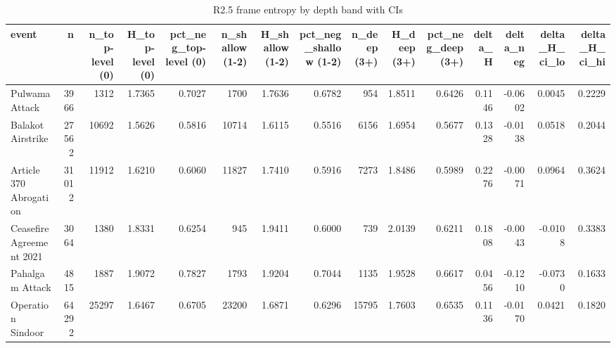 \begin{table}
\caption{R2.5 frame entropy by depth band with CIs}
\label{tab:r1r2_depth_diversification}
\begin{tabular}{lrrrrrrrrrrrrrr}
\toprule
event & n & n\_top-level (0) & H\_top-level (0) & pct\_neg\_top-level (0) & n\_shallow (1-2) & H\_shallow (1-2) & pct\_neg\_shallow (1-2) & n\_deep (3+) & H\_deep (3+) & pct\_neg\_deep (3+) & delta\_H & delta\_neg & delta\_H\_ci\_lo & delta\_H\_ci\_hi \\
\midrule
Pulwama Attack & 3966 & 1312 & 1.7365 & 0.7027 & 1700 & 1.7636 & 0.6782 & 954 & 1.8511 & 0.6426 & 0.1146 & -0.0602 & 0.0045 & 0.2229 \\
Balakot Airstrike & 27562 & 10692 & 1.5626 & 0.5816 & 10714 & 1.6115 & 0.5516 & 6156 & 1.6954 & 0.5677 & 0.1328 & -0.0138 & 0.0518 & 0.2044 \\
Article 370 Abrogation & 31012 & 11912 & 1.6210 & 0.6060 & 11827 & 1.7410 & 0.5916 & 7273 & 1.8486 & 0.5989 & 0.2276 & -0.0071 & 0.0964 & 0.3624 \\
Ceasefire Agreement 2021 & 3064 & 1380 & 1.8331 & 0.6254 & 945 & 1.9411 & 0.6000 & 739 & 2.0139 & 0.6211 & 0.1808 & -0.0043 & -0.0108 & 0.3383 \\
Pahalgam Attack & 4815 & 1887 & 1.9072 & 0.7827 & 1793 & 1.9204 & 0.7044 & 1135 & 1.9528 & 0.6617 & 0.0456 & -0.1210 & -0.0730 & 0.1633 \\
Operation Sindoor & 64292 & 25297 & 1.6467 & 0.6705 & 23200 & 1.6871 & 0.6296 & 15795 & 1.7603 & 0.6535 & 0.1136 & -0.0170 & 0.0421 & 0.1820 \\
\bottomrule
\end{tabular}
\end{table}
